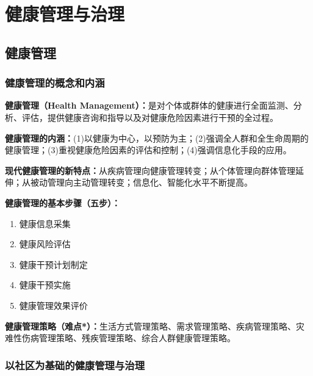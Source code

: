 \chapter{健康管理与治理}
\setcounter{chapter}{16}

\section{健康管理}

\subsection{健康管理的概念和内涵}

\begin{defbox}
\textbf{健康管理（Health Management）：}是对个体或群体的健康进行全面监测、分析、评估，提供健康咨询和指导以及对健康危险因素进行干预的全过程。

\textbf{健康管理的内涵：}(1)以健康为中心，以预防为主；(2)强调全人群和全生命周期的健康管理；(3)重视健康危险因素的评估和控制；(4)强调信息化手段的应用。

\textbf{现代健康管理的新特点：}从疾病管理向健康管理转变；从个体管理向群体管理延伸；从被动管理向主动管理转变；信息化、智能化水平不断提高。

\textbf{健康管理的基本步骤（五步）：}
\begin{enumerate}[leftmargin=*]
    \item 健康信息采集
    \item 健康风险评估
    \item 健康干预计划制定
    \item 健康干预实施
    \item 健康管理效果评价
\end{enumerate}

\textbf{健康管理策略（难点*）：}生活方式管理策略、需求管理策略、疾病管理策略、灾难性伤病管理策略、残疾管理策略、综合人群健康管理策略。
\end{defbox}

\subsection{以社区为基础的健康管理与治理}

